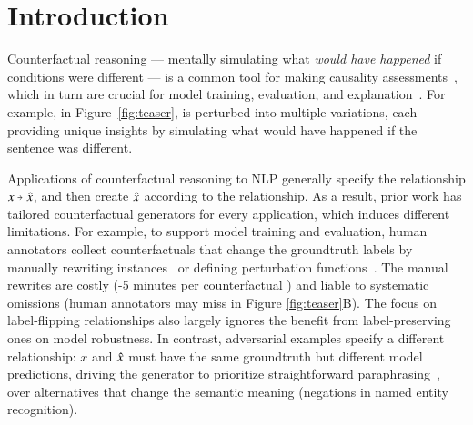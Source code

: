 \section{Introduction}
\label{sec:intro}



Counterfactual reasoning --- mentally simulating what \emph{would have happened} if conditions were different --- is a common tool for making causality assessments~\cite{kahneman}, which in turn are crucial for model training, evaluation, and explanation~\cite{miller}. 
For example, in Figure~\ref{fig:teaser},  is perturbed into multiple variations, each providing unique insights by simulating what would have happened if the sentence was different.

Applications of counterfactual reasoning to NLP generally specify the relationship $x \veryshortarrow \xp$, and then create $\hat{x}$ according to the relationship.
As a result, prior work has tailored counterfactual generators for every application, which induces different limitations.
For example, to support model training and evaluation, human annotators collect counterfactuals that change the groundtruth labels by manually rewriting instances~\cite{gardner2020contrast} or defining perturbation functions~\cite{wu2019errudite}.
The manual rewrites are costly (-5 minutes per counterfactual \cite{kaushik2019learning}) and liable to systematic omissions (\eg human annotators may miss  in Figure \ref{fig:teaser}B).
The focus on label-flipping relationships also largely ignores the benefit from label-preserving ones on model robustness.
In contrast, adversarial examples specify a different relationship: $x$ and $\hat{x}$ must have the same groundtruth but different model predictions, driving the generator to prioritize straightforward paraphrasing~\cite{iyyer2018adversarial, ribeiro2018semantically}, over alternatives that change the semantic meaning (\eg negations in named entity recognition).

